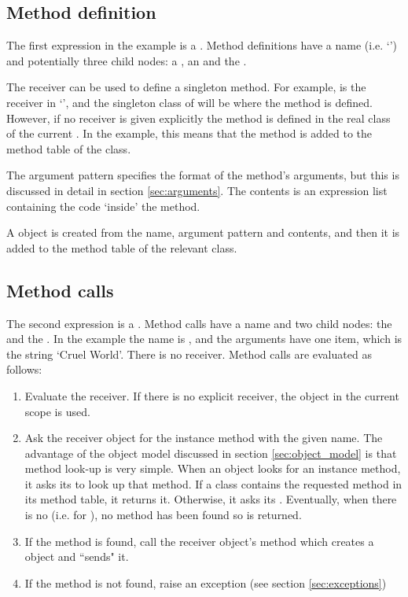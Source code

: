 \subsection{Method definition}

The first expression in the example is a . Method definitions have a name (i.e. `') and potentially three child nodes: a , an  and the .

The receiver can be used to define a singleton method. For example,  is the receiver in `', and the singleton class of  will be where the  method is defined. However, if no receiver is given explicitly the method is defined in the real class of the current . In the example, this means that the  method is added to the method table of the  class.

The argument pattern specifies the format of the method's arguments, but this is discussed in detail in section \ref{sec:arguments}. The contents is an expression list containing the code `inside' the method.

A  object is created from the name, argument pattern and contents, and then it is added to the method table of the relevant class.

\subsection{Method calls}

The second expression is a . Method calls have a name and two child nodes: the  and the . In the example the name is , and the arguments have one item, which is the string `Cruel World'. There is no receiver. Method calls are evaluated as follows:

\begin{enumerate}
  \item Evaluate the receiver. If there is no explicit receiver, the  object in the current scope is used.
  \item Ask the receiver object for the instance method with the given name. The advantage of the object model discussed in section \ref{sec:object_model} is that method look-up is very simple. When an object looks for an instance method, it asks its  to look up that method. If a class contains the requested method in its method table, it returns it. Otherwise, it asks its . Eventually, when there is no  (i.e. for ), no method has been found so  is returned.
  \item If the method is found, call the receiver object's  method which creates a  object and \linebreak ``sends" it.
  \item If the method is not found, raise an exception (see section \ref{sec:exceptions})
\end{enumerate}

